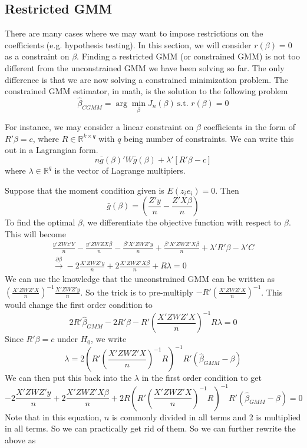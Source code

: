 \documentclass[12pt]{article}
\theoremstyle{definition}
\theoremstyle{property}
\theoremstyle{assumption}
\theoremstyle{example}
\theoremstyle{comment}
\begin{document}
\subsection{Restricted GMM}
There are many cases where we may want to impose restrictions on the coefficients (e.g. hypothesis testing). In this section, we will consider $r(\beta)=0$ as a constraint on $\beta$. Finding a restricted GMM (or constrained GMM) is not too different from the unconstrained GMM we have been solving so far. The only difference is that we are now solving a constrained minimization problem.  The constrained GMM estimator, in math, is the solution to the following problem
\[
\hat{\beta}_{CGMM}=\arg\min_\beta J_n(\beta) \ \text{s.t. } r(\beta)=0
\]
\par For instance, we may consider a linear constraint on $\beta$ coefficients in the form of $R'\beta=c$, where $R\in\mathbb{R}^{k\times q}$ with $q$ being number of constraints. We can write this out in a Lagrangian form.
\[
n\bar{g}(\beta)'W\bar{g}(\beta) + \lambda' [R'\beta-c]
\]
where $\lambda\in\mathbb{R}^q$ is the vector of Lagrange multipiers.\par
Suppose that the moment condition given is $E(z_ie_i)=0$. Then 
\[
\bar{g}(\beta)=\left(\frac{Z'y}{n}-\frac{Z'X\beta}{n}\right)
\] To find the optimal $\beta$, we differentiate the objective function with respect to $\beta$. This will become
\begin{gather*}
\frac{y'ZWz'Y}{n}-\frac{y'ZWZX\beta}{n}-\frac{\beta'X'ZWZ'y}{n}+\frac{\beta'X'ZWZ'X\beta}{n}+\lambda'R'\beta-\lambda'C\\
\xrightarrow{\partial\beta} -2\frac{X'ZWZ'y}{n}+2\frac{X'ZWZ'X\beta}{n}+R\lambda =0
\end{gather*}
We can use the knowledge that the unconstrained GMM can be written as \small{$\left(\frac{X'ZWZ'X}{n}\right)^{-1}\frac{X'ZWZ'y}{n}$}\normalsize. So the trick is to pre-multiply $-R'\left(\frac{X'ZWZ'X}{n}\right)^{-1}$. This would change the first order condition to
\[
2R'\hat{\beta}_{GMM}-2R'\beta-R'\left(\frac{X'ZWZ'X}{n}\right)^{-1}R\lambda =0
\]
Since $R'\beta=c$ under $H_0$, we write 
\[
\lambda = 2\left(R'\left(\frac{X'ZWZ'X}{n}\right)^{-1}R\right)^{-1}R'(\hat{\beta}_{GMM}-\beta)
\]
We can then put this back into the $\lambda$ in the first order condition to get
\[
-2\frac{X'ZWZ'y}{n}+2\frac{X'ZWZ'X\beta}{n}+2R\left(R'\left(\frac{X'ZWZ'X}{n}\right)^{-1}R\right)^{-1}R'(\hat{\beta}_{GMM}-\beta)=0
\]
Note that in this equation, $n$ is commonly divided in all terms and $2$ is multiplied in all terms. So we can practically get rid of them. So we can further rewrite the above as
\end{document}
